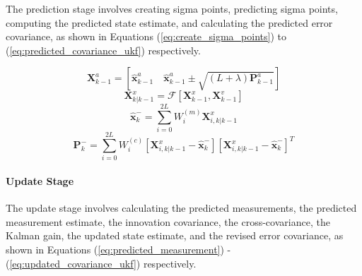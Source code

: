 The prediction stage involves creating sigma points, predicting sigma points, computing the predicted state estimate, and calculating the predicted error covariance, as shown in Equations (\ref{eq:create_sigma_points}) to (\ref{eq:predicted_covariance_ukf}) respectively.

\begin{equation}
\mathbf{X}^a_{k-1} = \left[\hat{\mathbf{x}}^a_{k-1} \quad \hat{\mathbf{x}}^a_{k-1} \pm \sqrt{(L+\lambda)\mathbf{P}^a_{k-1}}\right]
\label{eq:create_sigma_points}
\end{equation}
\begin{equation}
\mathbf{X}^x_{k|k-1} = \mathcal{F}\left[\mathbf{X}^x_{k-1}, \mathbf{X}^v_{k-1}\right]
\label{eq:predict_sigma_points}
\end{equation}
\begin{equation}
\hat{\mathbf{x}}^-_k = \sum_{i=0}^{2L} W^{(m)}_i \mathbf{X}^x_{i,k|k-1}
\label{eq:predicted_state_ukf}
\end{equation}
\begin{equation}
\mathbf{P}^-_k = \sum_{i=0}^{2L} W^{(c)}_i \left[\mathbf{X}^x_{i,k|k-1} - \hat{\mathbf{x}}^-_k\right]\left[\mathbf{X}^x_{i,k|k-1} - \hat{\mathbf{x}}^-_k\right]^T
\label{eq:predicted_covariance_ukf}
\end{equation}

\paragraph{Update Stage}\mbox{}

The update stage involves calculating the predicted measurements, the predicted measurement estimate, the innovation covariance, the cross-covariance, the Kalman gain, the updated state estimate, and the revised error covariance, as shown in Equations (\ref{eq:predicted_measurement}) - (\ref{eq:updated_covariance_ukf}) respectively.

